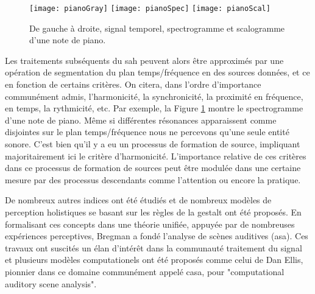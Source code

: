   \begin{figure}
    \texttt{[image: pianoGray]}
    \texttt{[image: pianoSpec]}
    \texttt{[image: pianoScal]}
    \caption{De gauche à droite, signal temporel, spectrogramme et scalogramme d'une note de piano.}
    \label{fig:piano}
  \end{figure}

  Les traitements subséquents  du sah peuvent alors être approximés par une opération de segmentation du plan temps/fréquence en des sources données, et ce en fonction de certains critères.  On citera, dans l'ordre d'importance communément admis, l'harmonicité, la synchronicité, la proximité en fréquence, en temps, la rythmicité, etc. Par exemple, la Figure \ref{fig:piano} montre le spectrogramme d'une note de piano. Même si différentes résonances apparaissent comme disjointes sur le plan temps/fréquence nous ne percevons qu'une seule entité sonore. C'est bien qu'il y a eu un processus de formation de source, impliquant majoritairement ici le critère d'harmonicité. L'importance relative de ces critères dans ce processus de formation de sources peut être modulée dans une certaine mesure par des processus descendants comme l'attention ou encore la pratique.


  De nombreux autres indices ont été étudiés et de nombreux modèles de perception holistiques se basant sur les règles de la gestalt ont été proposés. En formalisant ces concepts dans une théorie unifiée, appuyée par de nombreuses expériences perceptives, Bregman a fondé l'analyse de scènes auditives (asa)\cite{bregman1994auditory}. Ces travaux ont suscités un élan d'intérêt dans la communauté traitement du signal et plusieurs modèles computationels ont été proposés comme celui de Dan Ellis\cite{ellis1996prediction}, pionnier dans ce domaine communément appelé casa, pour "computational auditory scene analysis".


